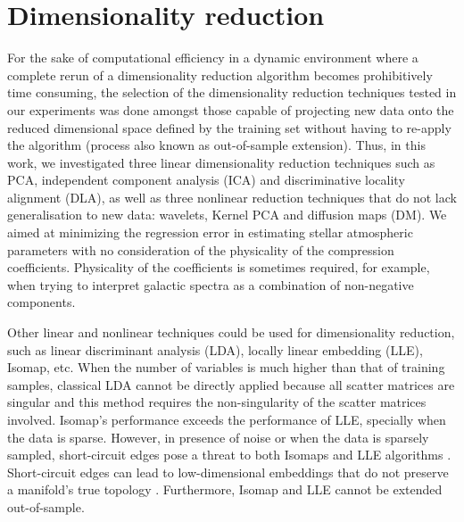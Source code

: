 \documentclass[a4paper,fleqn,usenatbib]{mnras}
\begin{document}
\section{Dimensionality reduction}
\label{sec:dimred}

For the sake of computational efficiency in a dynamic environment
where a complete rerun of a dimensionality reduction algorithm becomes
prohibitively time consuming, the selection of the dimensionality
reduction techniques tested in our experiments was done amongst those
capable of projecting new data onto the reduced dimensional space
defined by the training set without having to re-apply the algorithm
(process also known as out-of-sample extension). Thus, in this work,
we investigated three linear dimensionality reduction techniques such
as PCA, independent component analysis (ICA) and discriminative
locality alignment (DLA), as well as three nonlinear reduction
techniques that do not lack generalisation to new data: wavelets,
Kernel PCA and diffusion maps (DM).  We aimed at minimizing the
regression error in estimating stellar atmospheric parameters with no
consideration of the physicality of the compression
coefficients. Physicality of the coefficients is sometimes required,
for example, when trying to interpret galactic spectra as a
combination of non-negative components.

Other linear and nonlinear techniques could be used for dimensionality
reduction, such as linear discriminant analysis (LDA), locally linear
embedding (LLE), Isomap, etc. When the number of variables is much
higher than that of training samples, classical LDA cannot be directly
applied because all scatter matrices are singular and this method
requires the non-singularity of the scatter matrices involved.
Isomap's performance exceeds the performance of LLE, specially when
the data is sparse. However, in presence of noise or when the data is
sparsely sampled, short-circuit edges pose a threat to both Isomaps
and LLE algorithms \citep{saxena:04}. Short-circuit edges can lead to
low-dimensional embeddings that do not preserve a manifold's true
topology \citep{balasubramanianISOMAP:02}. Furthermore, Isomap and LLE
cannot be extended out-of-sample. 

\end{document}
